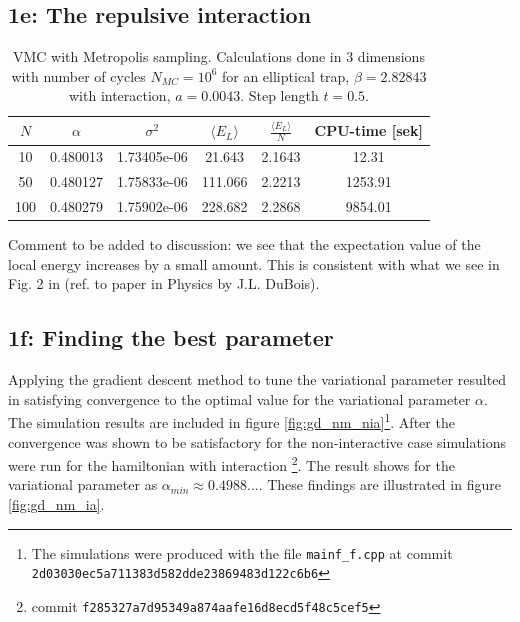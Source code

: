 \subsection*{\textbf{1e:} The repulsive interaction}

\begin{table}[]
    \centering
    \begin{tabular}{|c|c|c|c|c|c|}
    \hline
         $N$ & $\alpha$ & $\sigma^2$ & $\langle E_L \rangle$ & $\frac{\langle E_L \rangle}{N}$ & CPU-time [sek] \\
         \hline
         10 & 0.480013 & 1.73405e-06 & 21.643 & 2.1643 & 12.31 \\
         \hline
         50 & 0.480127 & 1.75833e-06 & 111.066 & 2.2213 & 1253.91\\
         \hline
         100 & 0.480279 & 1.75902e-06 & 228.682 & 2.2868 & 9854.01 \\
         \hline
    \end{tabular}
    \caption{VMC with Metropolis sampling. Calculations done in 3 dimensions with number of cycles $N_{MC} = 10^{6}$ for an elliptical trap, $\beta = 2.82843$ with interaction, $a = 0.0043$. Step length $t = 0.5$.}
    \label{tab:Re.int.}
\end{table}

Comment to be added to discussion: we see that the expectation value of the local energy increases by a small amount. This is consistent with what we see in Fig. 2 in (ref. to paper in Physics by J.L. DuBois). 


\subsection*{\textbf{1f:} Finding the best parameter}
Applying the gradient descent method to tune the variational parameter resulted in satisfying convergence to the optimal value for the variational parameter $\alpha$. The simulation results are included in figure \ref{fig:gd_nm_nia}\footnote{The simulations were produced with the file \lstinline{mainf_f.cpp} at commit \lstinline{2d03030ec5a711383d582dde23869483d122c6b6}}. After the convergence was shown to be satisfactory for the non-interactive case simulations were run for the hamiltonian with interaction \footnote{commit \lstinline{f285327a7d95349a874aafe16d8ecd5f48c5cef5}}. The result shows for the variational parameter as  $\alpha_{min} \approx 0.4988\ldots$. These findings are illustrated in figure \ref{fig:gd_nm_ia}. 


